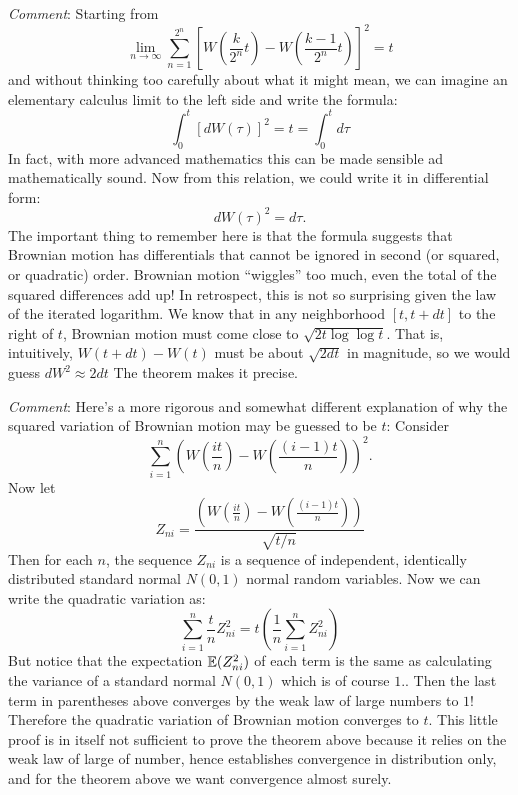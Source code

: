 \begin{problem}
 {\it Comment}:  Starting from
  $$
    \lim_{n \to \infty}
             \sum_{n=1}^{2^n}
               \left[
                  W\left( \frac{k}{2^n} t \right) -
                  W\left( \frac{k-1}{2^n} t \right)
               \right]^2
           = t
  $$
  and without thinking too carefully about what it might mean, we can
  imagine an elementary calculus limit to the left side and write the
  formula:
  $$
    \int_0^t [ dW(\tau) ]^2 = t = \int_0^t d\tau
  $$
  In fact, with more advanced mathematics this can be made sensible ad
  mathematically sound.  Now from this relation, we could write it in
  differential form:
  $$
    dW(\tau)^2 = d\tau.
  $$
  \ni The important thing to remember here is that the formula suggests
  that Brownian motion has differentials that cannot be ignored in
  second (or squared, or quadratic) order.  Brownian motion ``wiggles''
  too much, even the total of the squared differences add up!  In
  retrospect, this is not so surprising given the law of the iterated
  logarithm.  We know that in any neighborhood $[t, t + dt]$ to the
  right of $t$, Brownian motion must come close to $\sqrt{2t \log \log
  t}$.  That is, intuitively, $W(t+dt) - W(t)$ must be about $\sqrt{2
  dt}$ in magnitude, so we would guess $dW^2 \approx 2dt$  The theorem
  makes it precise.

\begin{sol}

\end{sol}
\end{problem}

\begin{problem}
 {\it Comment}:
  Here's a more rigorous and somewhat different explanation of why the squared
  variation of Brownian motion may be guessed to be $t$:  Consider
  $$
      \sum_{i=1}^{n} \left( W\left( \frac{it}{n} \right) - W\left(
      \frac{(i-1)t}{n} \right)  \right)^2.
  $$
  Now let
  $$
  Z_{ni} = \frac{ \left( W\left( \frac{it}{n} \right) - W\left(
      \frac{(i-1)t}{n} \right) \right) }{ \sqrt{t/n} }
  $$
  Then for each $n$, the sequence $Z_{ni}$ is a sequence of independent,
  identically distributed standard normal $N(0,1)$ normal random
  variables.
  Now we can write the quadratic variation as:
  $$
      \sum_{i=1}^{n} \frac{t}{n} Z_{ni}^2 = t \left( \frac{1}{n}
      \sum_{i=1}^{n} Z_{ni}^2 \right)
  $$
  But notice that the expectation $\mathbb{E}(Z_{ni}^2)$ of each term is the same
  as calculating the variance of a standard normal $N(0,1)$ which is of
  course $1$..  Then the last term in parentheses above converges by the weak law of
  large numbers to $1$!  Therefore the quadratic variation of Brownian
  motion converges to $t$.  This little proof is in itself not
  sufficient to prove the theorem above because it relies on the weak
  law of large of number, hence establishes convergence in distribution
  only, and for the theorem above we want convergence almost surely.

\begin{sol}

\end{sol}
\end{problem}

